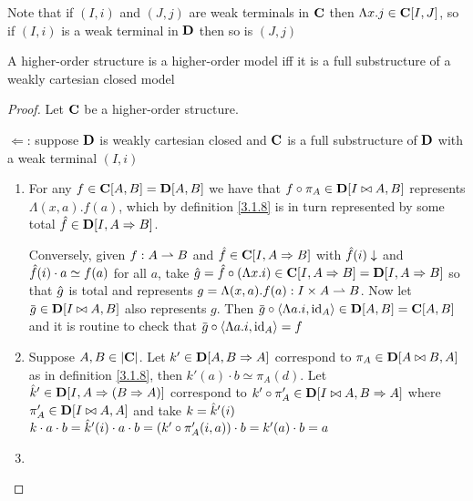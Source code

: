 \documentclass[11pt]{article}
\begin{document}
Note that if \((I,i)\) and \((J,j)\) are weak terminals in \(\operatorname{\textbf{C}}\) then \(\Lambda x.j\in\operatorname{\textbf{C}}[I,J]\), so
if \((I,i)\) is a weak terminal in \(\operatorname{\textbf{D}}\) then so is \((J,j)\)

\begin{theorem}[]
A higher-order structure is a higher-order model iff it is a full substructure of a weakly
cartesian closed model
\end{theorem}

\begin{proof}
Let \(\operatorname{\textbf{C}}\) be a higher-order structure.

\(\Leftarrow\): suppose \(\operatorname{\textbf{D}}\) is weakly cartesian closed and \(\operatorname{\textbf{C}}\) is a
full substructure of \(\operatorname{\textbf{D}}\) with a weak terminal \((I,i)\)
\begin{enumerate}
\item For any \(f\in\operatorname{\textbf{C}}[A,B]=\operatorname{\textbf{D}}[A,B]\) we have that \(f\circ\pi_A\in\operatorname{\textbf{D}}[I\bowtie A,B]\) represents \(\Lambda(x,a).f(a)\),
which by definition \ref{3.1.8} is in turn represented by some total \(\hat{f}\in\operatorname{\textbf{D}}[I,A\Rightarrow B]\).

Conversely, given \(f:A\rightharpoonup B\) and \(\hat{f}\in\operatorname{\textbf{C}}[I,A\Rightarrow B]\) with \(\hat{f}(i)\downarrow\)
and \(\hat{f}(i)\cdot a\simeq f(a)\) for all \(a\), take \(\hat{g}=\hat{f}\circ(\Lambda x.i)\in\operatorname{\textbf{C}}[I,A\Rightarrow B]=\operatorname{\textbf{D}}[I,A\Rightarrow B]\) so
that \(\hat{g}\) is total and represents \(g=\Lambda(x,a).f(a):I\times A\rightharpoonup B\). Now
let \(\barg\in\bD[I\bowtie A,B]\) also represents \(g\). Then \(\barg\circ\la\Lambda a.i,\id_A\ra\in\bD[A,B]=\bC[A,B]\) and
it is routine to check that \(\barg\circ\la\Lambda a.i,\id_A\ra=f\)

\item Suppose \(A,B\in\abs{\bC}\). Let \(k'\in\operatorname{\textbf{D}}[A,B\Rightarrow A]\) correspond to \(\pi_A\in\operatorname{\textbf{D}}[A\bowtie B,A]\) as in
definition \ref{3.1.8}, then \(k'(a)\cdot b\simeq\pi_A(d)\). Let \(\hat{k}'\in\operatorname{\textbf{D}}[I,A\Rightarrow(B\Rightarrow A)]\) correspond
to \(k'\circ\pi_A'\in\operatorname{\textbf{D}}[I\bowtie A,B\Rightarrow A]\) where \(\pi_A'\in\operatorname{\textbf{D}}[I\bowtie A,A]\) and take \(k=\hat{k}'(i)\)
\(k\cdot a\cdot b=\hat{k}'(i)\cdot a\cdot b=(k'\circ\pi_A'(i,a))\cdot b=k'(a)\cdot b=a\)

\item 
\end{enumerate}


\end{proof}
\end{document}
